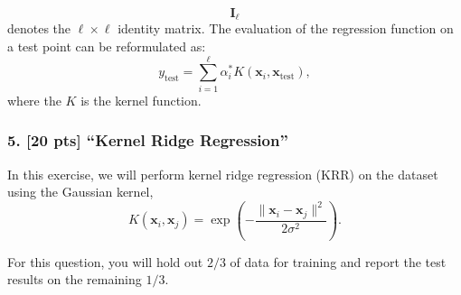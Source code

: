 \documentclass{article}
\begin{document}
\[
\mathbf{I}_\ell
\]
denotes the \(\ell \times \ell\) identity matrix. The evaluation of the regression function on a test point can be reformulated as:
\[
y_{\text{test}} = \sum_{i=1}^\ell \alpha_i^* K(\mathbf{x}_i, \mathbf{x}_{\text{test}}),  \tag{13}
\]
where the \(K\) is the kernel function.

\subsubsection*{5. [20 pts] ``Kernel Ridge Regression''}

In this exercise, we will perform kernel ridge regression (KRR) on the dataset using the Gaussian kernel,
\[
K(\mathbf{x}_i, \mathbf{x}_j) = \exp \left( - \frac{\|\mathbf{x}_i - \mathbf{x}_j\|^2}{2\sigma^2} \right). \tag{14}
\]

For this question, you will hold out \(2/3\) of data for training and report the test results on the remaining \(1/3\).
\end{document}
